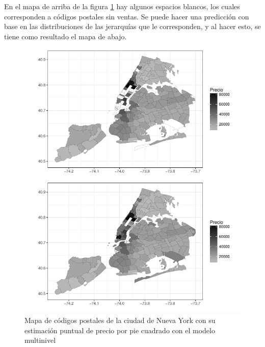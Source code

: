 En el mapa de arriba de la figura \ref{fig:res_map_alpha} hay algunos espacios blancos, los cuales corresponden a códigos postales sin ventas. Se puede hacer una predicción con base en las distribuciones de las jerarquías que le corresponden, y al hacer esto, se tiene como resultado el mapa de abajo. %

\begin{figure}[H]
    \centering
    \includegraphics[width=\textwidth]{images/res_map_alpha.pdf}
    \caption{Mapa de códigos postales de la ciudad de Nueva York con su estimación puntual de precio por pie cuadrado con el modelo multinivel}
    \label{fig:res_map_alpha}
\end{figure}


